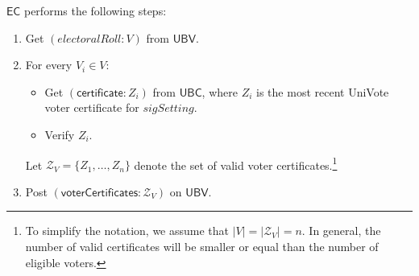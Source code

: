 \documentclass[bibtotoc,halfparskip,oneside]{scrreprt}
\newcommand{\EC}{\ensuremath{\mathsf{EC}}\xspace}
\newcommand{\UBC}{\ensuremath{\mathsf{UBC}}\xspace}
\newcommand{\UBV}{\ensuremath{\mathsf{UBV}}\xspace}
\begin{document}
\EC performs the following steps:
\begin{enumerate}[resume]
	\item Get  $(\mathit{electoralRoll}:V)$ from \UBV.
	\item For every $V_i\in V$:
	\begin{itemize}
		\item Get $(\mathsf{certificate}:Z_i)$ from \UBC, where $Z_i$ is the most recent UniVote voter certificate for $\mathit{sigSetting}$.
		\item Verify $Z_i$.
	\end{itemize}
	Let $\mathcal{Z}_V=\{Z_1,\ldots,Z_{n}\}$ denote the set of valid voter certificates.\footnote{To simplify the notation, we assume that $|V|=|\mathcal{Z}_V|=n$. In general, the number of valid certificates will be smaller or equal than the number of eligible voters.}
	\item Post $(\mathsf{voterCertificates}:\mathcal{Z}_V)$ on \UBV.
\end{enumerate}
\end{document}
